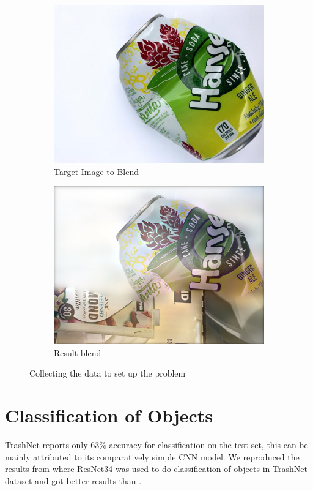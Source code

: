 \documentclass{article}
\begin{document}
\begin{figure}
\begin{subfigure}[b]{0.2\linewidth}
    \includegraphics[width=\linewidth]{data/images/04_GP_GAN/metal14.jpg}
    \caption{Target Image to Blend}
  \end{subfigure}
  \begin{subfigure}[b]{0.2\linewidth}
    \includegraphics[width=\linewidth]{data/images/04_GP_GAN/result-cardboard331-metal14.png}
    \caption{Result blend}
  \end{subfigure}
  \caption{Collecting the data to set up the problem}
  \label{fig:GAN_Blending}
\end{figure}


\section{Classification of Objects}
TrashNet \cite{yang2016classification} reports only 63\% accuracy for classification on the test set, this can be mainly attributed to its comparatively simple CNN model. We reproduced the results from \cite{CollinChing} where ResNet34 was used to do classification of objects in TrashNet dataset  \cite{yang2016classification} and got better results than \cite{CollinChing}. 
\end{document}
